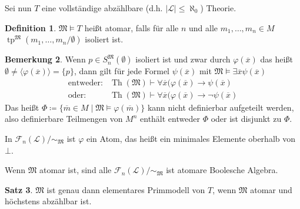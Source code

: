 \documentclass[12pt,parskip=full]{scrartcl}
\newcommand{\abs}[1]{{\left| #1 \right|}}
\theoremstyle{definition}
\newtheorem{theorem}{Satz}[section]
\newtheorem{definition}[theorem]{Definition}
\newtheorem{remark}[theorem]{Bemerkung}
\begin{document}
	Sei nun $T$ eine vollständige abzählbare (d.h. $\abs{\mathcal{L}} \leq \aleph_0$) Theorie.
	
	\begin{definition}
		$\mathfrak{M} \models T$ heißt atomar, falls für alle $n$ und alle $m_1, \dots, m_n \in M$ $\operatorname{tp}^\mathfrak{M}(m_1, \dots, m_n / \emptyset )$ isoliert ist.
	\end{definition}

	\begin{remark}
		Wenn $p \in S_n^\mathfrak{M}(\emptyset)$ isoliert ist und zwar durch $\varphi(\overline{x})$ das heißt $\emptyset \neq \langle \varphi(\overline{x}) \rangle = \{ p \}$, dann gilt für jede Formel $\psi(\overline{x})$ mit $\mathfrak{M} \models \exists
		 \overline{x} \psi(\overline{x})$
		 \begin{align*}
			 \text{entweder:}& \operatorname{Th}(\mathfrak{M}) \vdash \forall \overline{x} ( \varphi(\overline{x}) \to \psi(\overline{x}) \\
			 \text{oder:} & \operatorname{Th}(\mathfrak{M}) \vdash \forall \overline{x} ( \varphi(\overline{x}) \to \lnot \psi(\overline{x})
		 \end{align*}
		 Das heißt $\Phi \coloneqq \{ \overline{m} \in M \mid \mathfrak{M} \models \varphi(\overline{m}) \}$ kann nicht definierbar aufgeteilt werden, also definierbare Teilmengen von $M^n$ enthält entweder $\Phi$ oder ist disjunkt zu $\Phi$.
		 
		 In $\mathcal{F}_n(\mathcal{L}) / \sim_\mathfrak{M}$ ist $\varphi$ ein Atom, das heißt ein minimales Elemente oberhalb von $\bot$.
		 
		 Wenn $\mathfrak{M}$ atomar ist, sind alle $\mathcal{F}_n(\mathcal{L})/ \sim_\mathfrak{M}$ ist atomare Boolesche Algebra.
	\end{remark}

	\begin{theorem}
		$\mathfrak{M}$ ist genau dann elementares Primmodell von $T$, wenn $\mathfrak{M}$ atomar und höchstens abzählbar ist.
	\end{theorem}
\end{document}
